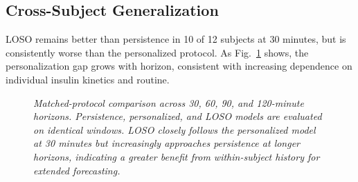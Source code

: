 \documentclass[journal]{IEEEtran}
\begin{document}
\subsection{Cross-Subject Generalization}

LOSO remains better than persistence in 10 of 12 subjects at 30 minutes, but is consistently worse than the personalized protocol. As Fig.~\ref{fig:matched} shows, the personalization gap grows with horizon, consistent with increasing dependence on individual insulin kinetics and routine.

\losotable
{}\of\maetable \global\let\persA=\pgfplotsretval
{}\of\maetable \global\let\persB=\pgfplotsretval
{}\of\maetable \global\let\persC=\pgfplotsretval
{}\of\maetable \global\let\persD=\pgfplotsretval
{}\of\maetable \global\let\persoA=\pgfplotsretval
{}\of\maetable \global\let\persoB=\pgfplotsretval
{}\of\maetable \global\let\persoC=\pgfplotsretval
{}\of\maetable \global\let\persoD=\pgfplotsretval
{}\of\losotable \global\let\losoA=\pgfplotsretval
{}\of\losotable \global\let\losoB=\pgfplotsretval
{}\of\losotable \global\let\losoC=\pgfplotsretval
{}\of\losotable \global\let\losoD=\pgfplotsretval

\begin{figure}[t]
\centering
{}
\caption{\small\textit{Matched-protocol comparison across 30, 60, 90, and 120-minute horizons. Persistence, personalized, and LOSO models are evaluated on identical windows. LOSO closely follows the personalized model at 30 minutes but increasingly approaches persistence at longer horizons, indicating a greater benefit from within-subject history for extended forecasting.}}
\label{fig:matched}
\end{figure}
\end{document}
